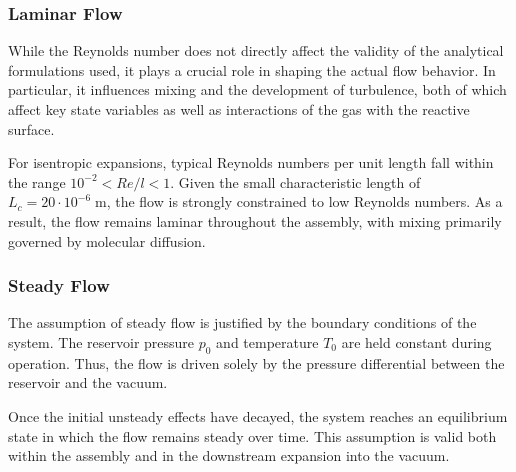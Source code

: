\subsubsection*{Laminar Flow}
	While the Reynolds number does not directly affect the validity of the analytical formulations used, it plays a crucial role in shaping the actual flow behavior.
	In particular, it influences mixing and the development of turbulence, both of which affect key state variables as well as interactions of the gas with the reactive surface.

	For isentropic expansions, typical Reynolds numbers per unit length fall within the range $10^{-2} < Re/l < 1$.
	Given the small characteristic length of $L_c = 20 \cdot 10^{-6}\;\text{m}$, the flow is strongly constrained to low Reynolds numbers.
	\cite{ames1953compressible}
	As a result, the flow remains laminar throughout the assembly, with mixing primarily governed by molecular diffusion.
	\cite{comsol_microfluidics_guide}

\subsubsection*{Steady Flow}
	The assumption of steady flow is justified by the boundary conditions of the system.
	The reservoir pressure $p_0$ and temperature $T_0$ are held constant during operation.
	Thus, the flow is driven solely by the pressure differential between the reservoir and the vacuum.

	Once the initial unsteady effects have decayed, the system reaches an equilibrium state in which the flow remains steady over time.
	This assumption is valid both within the assembly and in the downstream expansion into the vacuum.
	\cite{LiLam1964}

